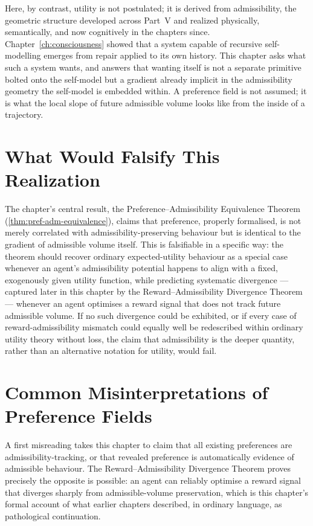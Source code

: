 \documentclass[12pt,twoside,openright]{book}
\begin{document}
Here, by contrast, utility is not postulated; it is derived
from admissibility, the geometric structure developed across
Part~V and realized physically, semantically, and now
cognitively in the chapters since. Chapter~\ref{ch:consciousness}
showed that a system capable of recursive self-modelling
emerges from repair applied to its own history. This chapter
asks what such a system wants, and answers that wanting itself
is not a separate primitive bolted onto the self-model but a
gradient already implicit in the admissibility geometry the
self-model is embedded within. A preference field is not
assumed; it is what the local slope of future admissible
volume looks like from the inside of a trajectory.

\section{What Would Falsify This Realization}
\label{sec:ch22-falsifiability}

The chapter's central result, the Preference--Admissibility
Equivalence Theorem (\cref{thm:pref-adm-equivalence}), claims
that preference, properly formalised, is not merely
correlated with admissibility-preserving behaviour but is
identical to the gradient of admissible volume itself. This
is falsifiable in a specific way: the theorem should recover
ordinary expected-utility behaviour as a special case
whenever an agent's admissibility potential happens to align
with a fixed, exogenously given utility function, while
predicting systematic divergence --- captured later in this
chapter by the Reward--Admissibility Divergence Theorem ---
whenever an agent optimises a reward signal that does not
track future admissible volume. If no such divergence could
be exhibited, or if every case of reward-admissibility
mismatch could equally well be redescribed within ordinary
utility theory without loss, the claim that admissibility is
the deeper quantity, rather than an alternative notation for
utility, would fail.

\section{Common Misinterpretations of Preference Fields}
\label{sec:ch22-misinterpretations}

A first misreading takes this chapter to claim that all
existing preferences are admissibility-tracking, or that
revealed preference is automatically evidence of admissible
behaviour. The Reward--Admissibility Divergence Theorem
proves precisely the opposite is possible: an agent can
reliably optimise a reward signal that diverges sharply from
admissible-volume preservation, which is this chapter's
formal account of what earlier chapters described, in
ordinary language, as pathological continuation.
\end{document}
